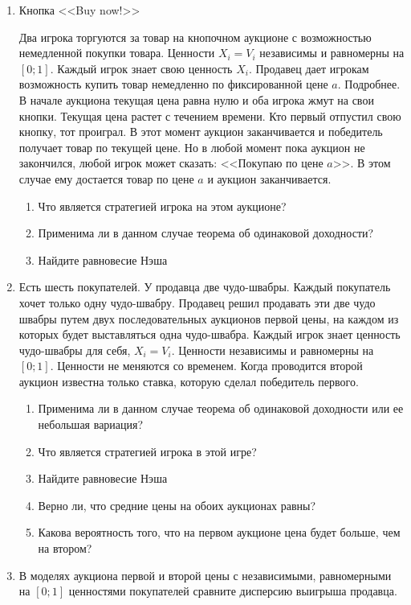 \begin{enumerate}
\item Кнопка <<Buy now!>>

Два игрока торгуются за товар на кнопочном аукционе с возможностью немедленной покупки товара. Ценности $ X_{i}=V_{i} $ независимы и равномерны на $ [0;1] $. Каждый игрок знает свою ценность $ X_{i} $. Продавец дает игрокам возможность купить товар немедленно по фиксированной цене $ a $. Подробнее. В начале аукциона текущая цена равна нулю и оба игрока жмут на свои кнопки. Текущая цена растет с течением времени. Кто первый отпустил свою кнопку, тот проиграл. В этот момент аукцион заканчивается и победитель получает товар по текущей цене. Но в любой момент пока аукцион не закончился, любой игрок может сказать: <<Покупаю по цене $ a $>>. В этом случае ему достается товар по цене $ a $ и аукцион заканчивается.
\begin{enumerate}
\item Что является стратегией игрока на этом аукционе?
\item Применима ли в данном случае теорема об одинаковой доходности?
\item Найдите равновесие Нэша
\end{enumerate}

\item Есть шесть покупателей. У продавца две чудо-швабры. Каждый покупатель хочет только одну чудо-швабру. Продавец решил продавать эти две чудо швабры путем двух последовательных аукционов первой цены, на каждом из которых будет выставляться одна чудо-швабра. Каждый игрок знает ценность чудо-швабры для себя, $ X_{i}=V_{i} $. Ценности независимы и равномерны на $ [0;1] $. Ценности не меняются со временем. Когда проводится второй аукцион известна только ставка, которую сделал победитель первого.

\begin{enumerate}
\item Применима ли в данном случае теорема об одинаковой доходности или ее небольшая вариация?
\item Что является стратегией игрока в этой игре?
\item Найдите равновесие Нэша
\item Верно ли, что средние цены на обоих аукционах равны?
\item Какова вероятность того, что на первом аукционе цена будет больше, чем на втором?
\end{enumerate}

\item В моделях аукциона первой и второй цены с независимыми, равномерными на $ [0;1] $ ценностями покупателей сравните дисперсию выигрыша продавца. 


\end{enumerate}

